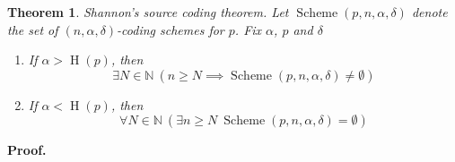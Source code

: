 \documentclass[aps,pra,onecolumn,notitlepage,superscriptaddress]{revtex4-1}
\newcommand{\N}{\mathbb{N}}
\newcommand{\op}[1]{\operatorname{#1}}
\newtheorem{theo}{Theorem}
\def\Proof{{\bf Proof.~}}
\begin{document}
    \begin{theo}
        Shannon's source coding theorem. 
        Let $\op{Scheme}(p,n,\alpha,\delta)$ denote the set of $(n,\alpha,\delta)$-coding schemes for $p$. Fix $\alpha$, $p$ and $\delta$
        \begin{enumerate}
            \item If $\alpha > \op H(p)$, then
            \begin{equation}
                \exists N \in \N \ (n \geq N \implies \op{Scheme}(p,n,\alpha,\delta) \neq \emptyset)
            \end{equation}

            \item If $\alpha < \op H(p)$, then
            \begin{equation}
                \forall N \in \N \ (\exists n \geq N \ \op{Scheme}(p,n,\alpha,\delta) = \emptyset)
            \end{equation}
        \end{enumerate}
    \end{theo}
    \Proof
\end{document}
